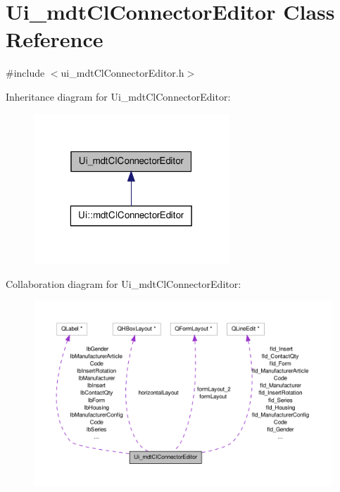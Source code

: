 \hypertarget{class_ui__mdt_cl_connector_editor}{\section{Ui\-\_\-mdt\-Cl\-Connector\-Editor Class Reference}
\label{class_ui__mdt_cl_connector_editor}
}


{\ttfamily \#include $<$ui\-\_\-mdt\-Cl\-Connector\-Editor.\-h$>$}



Inheritance diagram for Ui\-\_\-mdt\-Cl\-Connector\-Editor\-:\nopagebreak
\begin{figure}[H]
\begin{center}
\leavevmode
\includegraphics[width=208pt]{class_ui__mdt_cl_connector_editor__inherit__graph}
\end{center}
\end{figure}


Collaboration diagram for Ui\-\_\-mdt\-Cl\-Connector\-Editor\-:\nopagebreak
\begin{figure}[H]
\begin{center}
\leavevmode
\includegraphics[width=350pt]{class_ui__mdt_cl_connector_editor__coll__graph}
\end{center}
\end{figure}
